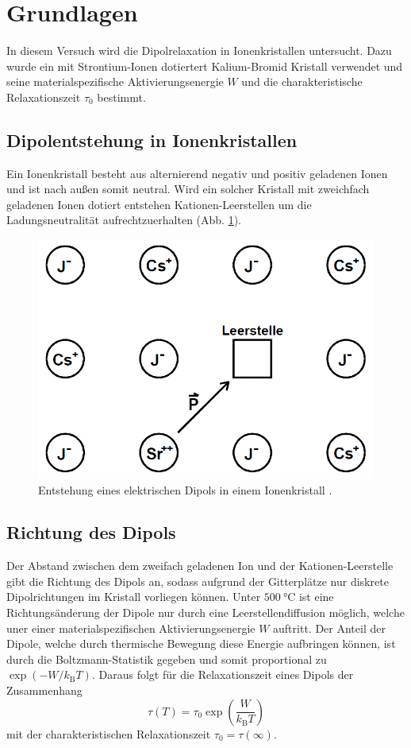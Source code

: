 \section{Grundlagen}
\label{sec:grundlagen}

In diesem Versuch wird die Dipolrelaxation in Ionenkristallen untersucht. 
Dazu wurde ein mit Strontium-Ionen dotiertert Kalium-Bromid Kristall verwendet und seine materialspezifische Aktivierungsenergie $W$ und die charakteristische Relaxationszeit $\tau_0$ bestimmt.
\FloatBarrier

\subsection{Dipolentstehung in Ionenkristallen} %
\label{sub:dipolentstehung_in_ionenkristallen}

Ein Ionenkristall besteht aus alternierend negativ und positiv geladenen Ionen und ist nach außen somit neutral.
Wird ein solcher Kristall mit zweichfach geladenen Ionen dotiert entstehen Kationen-Leerstellen um die Ladungsneutralität aufrechtzuerhalten (Abb. \ref{fig:dipol}). 
\begin{figure}
    \centering
    \includegraphics[width=0.5\linewidth]{img/Dipol.png}
    \caption{Entstehung eines elektrischen Dipols in einem Ionenkristall \cite{V48}.}
    \label{fig:dipol}
\end{figure}

\subsection{Richtung des Dipols} %
\label{sub:richtung_des_dipols}

Der Abstand zwischen dem zweifach geladenen Ion und der Kationen-Leerstelle gibt die Richtung des Dipols an, sodass aufgrund der Gitterplätze nur diskrete Dipolrichtungen im Kristall vorliegen können.
Unter $\SI{500}{\celsius}$ ist eine Richtungsänderung der Dipole nur durch eine Leerstellendiffusion möglich, welche uner einer materialspezifischen Aktivierungsenergie $W$ auftritt.
Der Anteil der Dipole, welche durch thermische Bewegung diese Energie aufbringen können, ist durch die Boltzmann-Statistik gegeben und somit proportional zu $\exp{\left(-W/k_\text{B}T\right)}$.
Daraus folgt für die Relaxationszeit eines Dipols der Zusammenhang
\begin{equation}
    \tau(T) = \tau_0 \exp{\left(\frac{W}{k_\text{B}T}\right)}
\end{equation}
mit der charakteristischen Relaxationszeit $\tau_0 = \tau(\infty)$.

